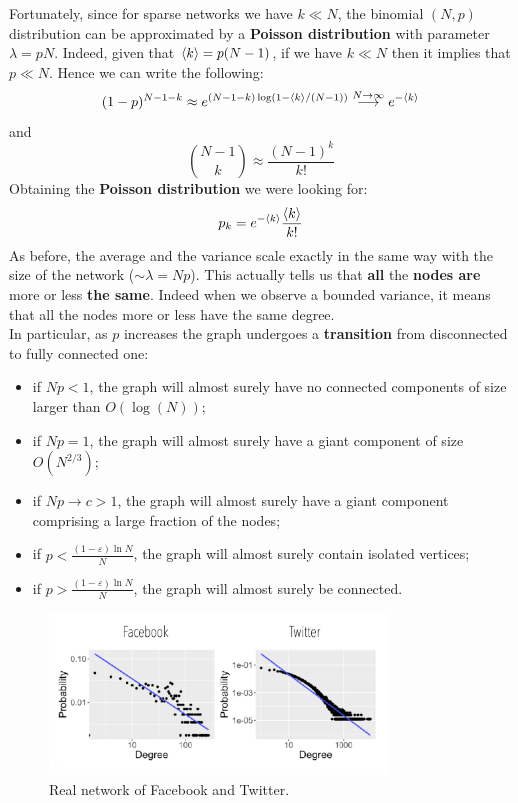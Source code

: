\documentclass[../main/main.tex]{subfiles}
\begin{document}
Fortunately, since for sparse networks we have \( k \ll N \), the binomial \( (N,p) \) distribution can be approximated by a \textbf{Poisson distribution} with parameter \( \lambda = p N \). Indeed, given that  \( \expval{k} = p(N-1)  \), if we have \( k \ll N \) then it implies that \( p \ll N \). Hence we can write the following:
\begin{equation*}
  (1-p)^{N-1-k} \approx e^{(N-1-k) \log (1- \expval{k}/(N-1) )} \overset{N \rightarrow \infty }{\longrightarrow } e^{- \expval{k} }
\end{equation*}
and
\begin{equation*}
  \binom{N-1}{k} \approx \frac{(N-1)^k}{k!}
\end{equation*}
Obtaining the \textbf{Poisson distribution} we were looking for:
\begin{equation}
  p_k = e^{- \expval{k} } \frac{\expval{k} }{k!}
\end{equation}
As before, the average and the variance scale exactly in the same way with the size of the network ($\sim \lambda = Np$). This actually tells us that \textbf{all} the \textbf{nodes are} more or less \textbf{the same}. Indeed when we observe a bounded variance, it means that all the nodes more or less have the same degree.\\
In particular, as $p$ increases the graph undergoes a \textbf{transition} from disconnected to fully connected one:
\begin{itemize}
\item if \( N p < 1 \), the graph will almost surely have no connected components of size larger than \( O(\log(N)) \);
\item if \( N p = 1 \), the graph will almost surely have a giant component of size \( O(N^{2/3}) \);
\item if \( N p \rightarrow c > 1 \), the graph will almost surely have a giant component comprising a large fraction of the nodes;
\item if \( p < \frac{(1- \varepsilon )\ln N}{N} \), the graph will almost surely contain isolated vertices;
\item if \( p > \frac{(1- \varepsilon )\ln N}{N} \),  the graph will almost surely be connected.
\end{itemize}

\begin{figure}[h!]
\centering
\includegraphics[width=0.8\textwidth]{../lessons/image/06/4.png}
\caption{\label{fig:06_3} Real network of Facebook and Twitter.}
\end{figure}
\end{document}
